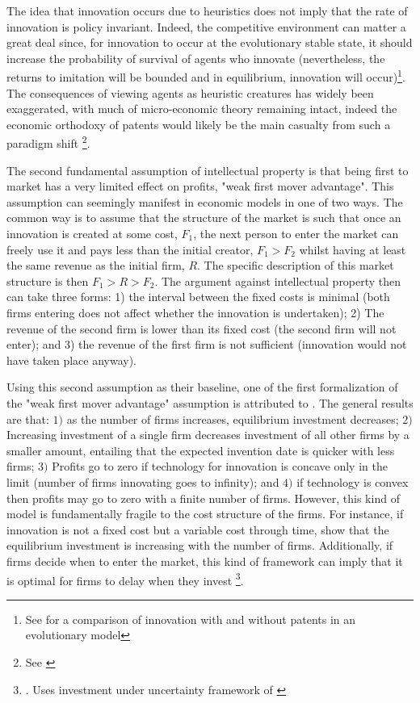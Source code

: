 The idea that innovation occurs due to heuristics does not imply that the rate of innovation is policy invariant. Indeed, the competitive environment can matter a great deal since, for innovation to occur at the evolutionary stable state, it should increase the probability of survival of agents who innovate (nevertheless, the returns to imitation will be bounded and in equilibrium, innovation will occur)\footnote{See \cite{Winter1993} for a comparison of innovation with and without patents in an evolutionary model}. The consequences of viewing agents as heuristic creatures has widely been exaggerated, with much of micro-economic theory remaining intact, indeed the economic orthodoxy of patents would likely be the main casualty from such a paradigm shift \footnote{See \cite{becker1962irrational}}.



The second fundamental assumption of intellectual property is that being first to market has a very limited effect on profits, "weak first mover advantage". This assumption can seemingly manifest in economic models in one of two ways. The common way is to assume that the structure of the market is such that once an innovation is created at some cost, $F_1$, the next person to enter the market can freely use it and pays less than the initial creator, $F_1>F_2$ whilst having at least the same revenue as the initial firm, $R$. The specific description of this market structure is then $F_1>R>F_2$. The argument against intellectual property then can take three forms: 1) the interval between the fixed costs is minimal (both firms entering does not affect whether the innovation is undertaken); 2) The revenue of the second firm is lower than its fixed cost (the second firm will not enter); and 3) the revenue of the first firm is not sufficient (innovation would not have taken place anyway).

Using this second assumption as their baseline, one of the first formalization of the "weak first mover advantage" assumption is attributed to \cite{loury_1979}. The general results are that: $1)$ as the number of firms increases, equilibrium investment decreases; $2)$ Increasing investment of a single firm decreases investment of all other firms by a smaller amount, entailing that the expected invention date is quicker with less firms; $3)$ Profits go to zero if technology for innovation is concave only in the limit (number of firms innovating goes to infinity); and $4)$ if technology is convex then profits may go to zero with a finite number of firms. However, this kind of model is fundamentally fragile to the cost structure of the firms. For instance, if innovation is not a fixed cost but a variable cost through time, \cite{lee1980market} show that the equilibrium investment is increasing with the number of firms. Additionally, if firms decide when to enter the market, this kind of framework can imply that it is optimal for firms to delay when they invest \footnote{\cite{Weeds2002}. Uses investment under uncertainty framework of \cite{DixitPindyck1994}}.

